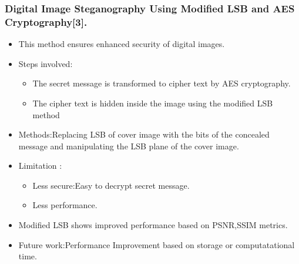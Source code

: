 \documentclass{beamer} %
\theoremstyle{definition} %
\begin{document}
\begin{frame}
\frametitle{Digital Image Steganography Using Modified LSB and AES Cryptography[3]. }
\begin{itemize}
	\item{ This method ensures enhanced security of digital images.}
	\item {Steps involved:}
	\begin{itemize}
	\item{The secret message is transformed to cipher text by AES cryptography.}
	\item{ The cipher text is hidden inside the image using the modified LSB method }
	\end{itemize}
	\item{Methods:Replacing LSB of cover image with the bits of the concealed message and manipulating the LSB plane of the cover image.}
	\item{Limitation :}
	\begin{itemize}
		\item {Less secure:Easy to decrypt secret message.}
		\item {Less performance.}
	\end{itemize}
	\item{Modified LSB shows improved performance based on PSNR,SSIM metrics.} 
	\item{Future work:Performance Improvement based on storage or computatational time.}
\end{itemize}
\end{frame}
\end{document}
